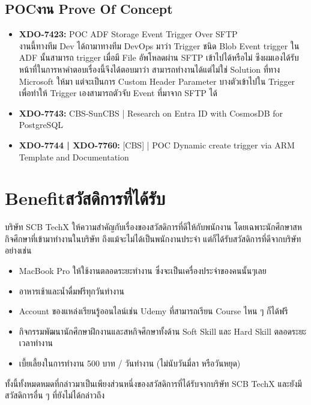 \subsection{\ifenglish POC\else งาน Prove Of Concept\fi}
\begin{itemize}
      \item \textbf{XDO-7423:} POC ADF Storage Event Trigger Over SFTP\\
            งานนี้ทางทีม Dev ได้ถามาทางทีม DevOps มาว่า Trigger ชนิด Blob Event trigger ใน ADF นั้นสามารถ trigger เมื่อมี File อัพโหลดผ่าน SFTP เข้าไปได้หรือไม่ ซึงผมเองได้รับหน้าที่ในการหาคำตอบเรื่องนี้จีงได้ตอบมาว่า สามารถทำงานได้แต่ไม่ใช่ Solution ที่ทาง Microsoft ให้มา แต่จะเป็นการ Custom Header Parameter บางตัวเข้าไปใน Trigger เพื่อทำให้ Trigger เองสามารถตัวจับ Event ที่มาจาก SFTP ได้
      \item \textbf{XDO-7743:} CBS-SunCBS | Research on Entra ID with CosmosDB for PostgreSQL
      \item \textbf{XDO-7744 | XDO-7760:} [CBS] | POC Dynamic create trigger via ARM Template and Documentation
\end{itemize}

\section{\ifenglish Benefit\else สวัสดิการที่ได้รับ\fi}
บริษัท SCB TechX ให้ความสำคัญกับเรื่องของสวัสดิการที่ดีให้กับพนักงาน โดยเฉพาะนักศึกษาสหกิจศึกษาที่เข้ามาทำงานในบริษัท
ถึงแม้จะไม่ได้เป็นพนักงานประจำ แต่ก็ได้รับสวัสดิการที่ดีจากบริษัทอย่างเช่น
\begin{itemize}
      \item MacBook Pro ให้ใช้งานตลอดระยะทำงาน ซึ่งจะเป็นเครื่องประจำของคนนั้นๆเลย
      \item อาหารเช้าและน้ำดื่มฟรีทุกวันทำงาน
      \item Account ของแหล่งเรียนรู้ออนไลน์เช่น Udemy ที่สามารถเรียน Course ไหน ๆ ก็ได้ฟรี
      \item กิจกรรมพัฒนานักศึกษาฝึกงานและสหกิจศึกษาทั้งด้าน Soft Skill และ Hard Skill ตลอดระยะเวลาทำงาน
      \item เบี้ยเลี้ยงในการทำงาน 500 บาท / วันทำงาน (ไม่นับวันมี่ลา หรือวันหยุด)
\end{itemize}
ทั้งนี้ทั้งหมดหมดที่กล่าวมาเป็นเพียงส่วนหนึ่งของสวัสดิการที่ได้รับจากบริษัท SCB TechX และยังมีสวัสดิการอื่น ๆ ที่ยังไม่ได้กล่าวถึง
